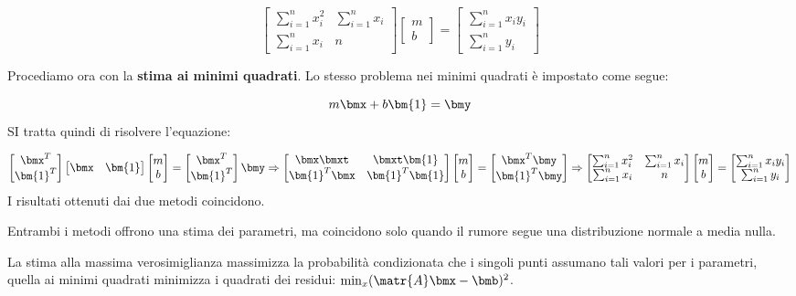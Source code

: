 \documentclass[\main/main.tex]{subfiles}
\begin{document}
\[
  \begin{bmatrix}
    \sum^n_{i=1}x^2_i & \sum^n_{i=1}x_i \\
    \sum^n_{i=1}x_i   & n
  \end{bmatrix}
  \begin{bmatrix}
    m \\ b
  \end{bmatrix}
  =
  \begin{bmatrix}
    \sum^n_{i=1}x_iy_i \\ \sum^n_{i=1}y_i
  \end{bmatrix}
\]

Procediamo ora con la \textbf{stima ai minimi quadrati}. Lo stesso problema nei minimi quadrati è impostato come segue:

\[
  m\bmx + b\bm{1} = \bmy
\]
SI tratta quindi di risolvere l'equazione:

\[
  \begin{bmatrix}
    \bmx^T \\ \bm{1}^T
  \end{bmatrix} \begin{bmatrix}
    \bmx & \bm{1}
  \end{bmatrix} \begin{bmatrix}
    m \\ b
  \end{bmatrix} = \begin{bmatrix}
    \bmx^T \\ \bm{1}^T
  \end{bmatrix} \bmy
  \Rightarrow
  \begin{bmatrix}
    \bmx\bmxt    & \bmxt\bm{1}    \\
    \bm{1}^T\bmx & \bm{1}^T\bm{1}
  \end{bmatrix}
  \begin{bmatrix}
    m \\ b
  \end{bmatrix}
  =
  \begin{bmatrix}
    \bmx^T\bmy \\ \bm{1}^T\bmy
  \end{bmatrix}
  \Rightarrow
  \begin{bmatrix}
    \sum^n_{i=1}x^2_i & \sum^n_{i=1}x_i \\
    \sum^n_{i=1}x_i   & n
  \end{bmatrix}
  \begin{bmatrix}
    m \\ b
  \end{bmatrix}
  =
  \begin{bmatrix}
    \sum^n_{i=1}x_iy_i \\ \sum^n_{i=1}y_i
  \end{bmatrix}
\]
I risultati ottenuti dai due metodi coincidono.

Entrambi i metodi offrono una stima dei parametri, ma coincidono solo quando il rumore segue una distribuzione normale a media nulla.

La stima alla massima verosimiglianza massimizza la probabilità condizionata che i singoli punti assumano tali valori per i parametri, quella ai minimi quadrati minimizza i quadrati dei residui: $\min_x (\matr{A}\bmx-\bmb)^2$.
\end{document}
